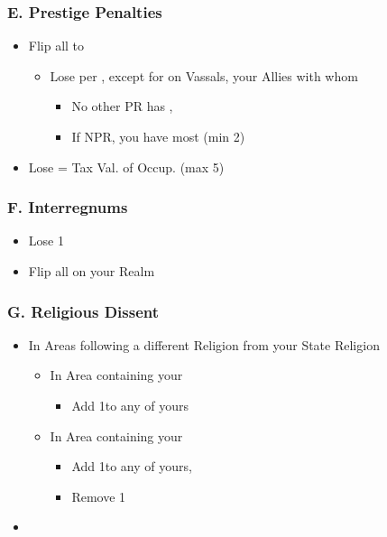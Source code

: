 \documentclass[10pt]{article}
\begin{document}
\framebreak

\subsubsection*{E. Prestige Penalties}
\begin{itemize}
	\item Flip all \disputedsuccession to \marriage
	\begin{itemize}
		\item Lose  per \disputedsuccession, except for \disputedsuccession on Vassals,  your Allies with whom
		\begin{itemize}
			\item No other PR has \alliance, 
			\item If NPR, you have most \influence (min 2)
		\end{itemize}
	\end{itemize}
	\item Lose \prestige = Tax Val. of Occup. \towns (max 5)
\end{itemize}

\subsubsection*{F. Interregnums}
\begin{itemize}
	\item Lose 1\stability
	\item Flip all \marriages on your Realm
\end{itemize}

\subsubsection*{G. Religious Dissent}
\begin{itemize}
	\item In Areas following a different Religion from your State Religion
	\begin{itemize}
		\item In  Area containing your \towns
		\begin{itemize}
			\item Add 1\unrest to any \town of yours
		\end{itemize}
		\item In  Area containing your \vassals
		\begin{itemize}
			\item Add 1\unrest to any \vassal of yours, 
			\item Remove 1\influence
		\end{itemize}
	\end{itemize}
	\item {}
\end{itemize}
\end{document}
